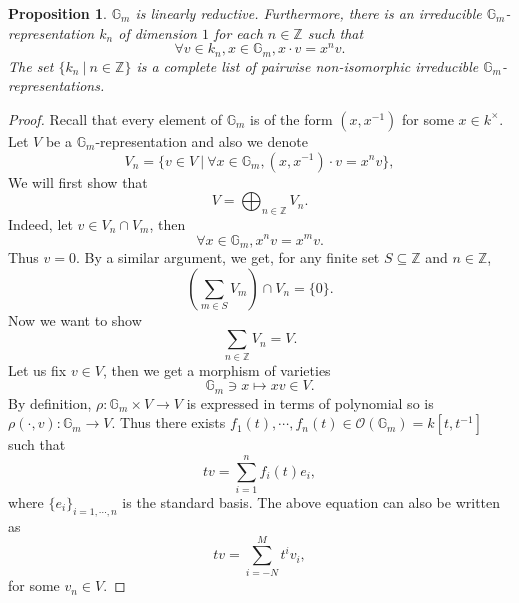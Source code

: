 \documentclass[10pt]{article}
\newtheorem{proposition}{Proposition}[section]
\numberwithin{equation}{theorem}
\newcommand{\Ouv}[0]{\mathcal{O}}
\newcommand{\Z}[0]{\mathbb{Z}}
\newcommand{\G}[0]{\mathbb{G}}
\newcommand{\sep}[0]{\:|\:}
\begin{document}
\begin{proposition}
  $\G_m$ is linearly reductive. Furthermore, there is an irreducible $\G_m$-representation $k_n$ of dimension $1$ for each $n\in\Z$ such that 
  \begin{equation*}
    \forall v\in k_n,x\in\G_m, x\cdot v = x^nv.
  \end{equation*}
  The set $\{k_n\sep n\in\Z\}$ is a complete list of pairwise non-isomorphic irreducible $\G_m$-representations.
\end{proposition}
\begin{proof}
 Recall that every element of $\G_m$ is of the form $(x,x^{-1})$ for some $x\in k^\times$. Let $V$ be a $\G_m$-representation and also we denote 
  \begin{equation*}
    V_n = \{v\in V\sep \forall x\in \G_m, (x,x^{-1})\cdot v = x^nv\},
  \end{equation*}
  We will first show that 
  \begin{equation*}
    V = \bigoplus_{n\in \Z}V_n.
  \end{equation*}
  Indeed, let $v\in V_n\cap V_m$, then
  \begin{equation*}
   \forall x\in\G_m, x^nv = x^mv.
  \end{equation*}
  Thus $v = 0$. By a similar argument, we get, for any finite set $S\subseteq \Z$ and $n\in\Z$,
  \begin{equation*}
    \left(\sum_{m\in S}V_m\right)\cap V_n = \{0\}.
  \end{equation*}
  Now we want to show 
  \begin{equation*}
    \sum_{n\in\Z}V_n = V.
  \end{equation*}
  Let us fix $v\in V$, then we get a morphism of varieties 
  \begin{equation*}
    \G_m\ni x\mapsto xv\in V.
  \end{equation*}
  By definition, $\rho:\G_m\times V\to V$ is expressed in terms of polynomial so is $\rho(\cdot,v):\G_m\to V$. Thus there exists $f_1(t),\cdots,f_n(t) \in \Ouv(\G_m) = k[t,t^{-1}]$ such that 
  \begin{equation*}
    tv = \sum_{i=1}^n f_i(t)e_i,
  \end{equation*}
  where $\{e_i\}_{i=1,\cdots,n}$ is the standard basis. The above equation can also be written as 
  \begin{equation*}
    tv = \sum_{i=-N}^M t^i v_i,
  \end{equation*}
  for some $v_n\in V$.%

\end{proof}
\end{document}
